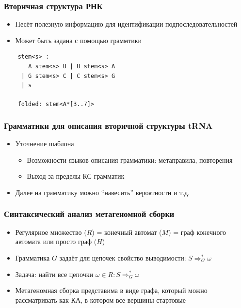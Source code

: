 \documentclass{beamer}
\begin{document}
\begin{frame}[fragile]
\transwipe[direction=90]
\frametitle{Вторичная структура РНК}
\begin{itemize}
    \item Несёт полезную информацию для идентификации подпоследовательностей
    \item Может быть задана с помощью граммтики
\end{itemize}
\begin{verbatim}
    stem<s> : 
       A stem<s> U | U stem<s> A 
     | G stem<s> C | C stem<s> G 
     | s

    folded: stem<A*[3..7]> 
\end{verbatim} 
\end{frame}

\begin{frame}[fragile]
  \transwipe[direction=90]
  \frametitle{Грамматики для описания вторичной структуры tRNA}
  \begin{itemize}
    \item Уточнение шаблона
    \begin{itemize}
       \item Возможности языков описания грамматики: метаправила, повторения
       \item Выход за пределы КС-грамматик
    \end{itemize}
    \item Далее на грамматику можно ``навесить'' вероятности и т.д.
  \end{itemize}
\end{frame}

\begin{frame}[fragile]
  \transwipe[direction=90]
  \frametitle{Синтаксический анализ метагеномной сборки}
  \begin{itemize}
    \item Регулярное множество ($R$) = конечный автомат ($M$) = граф конечного автомата или просто 
    граф ($H$)
    \pause
    \item Грамматика $G$ задаёт для цепочек свойство выводимости: $S \Rightarrow^*_G \omega$
    \item Задача: найти все цепочки $\omega \in R : S \Rightarrow^*_G \omega$ 
    \item Метагеномная сборка представима в виде графа, который можно рассматривать как КА, в 
    котором все вершины стартовые
  \end{itemize}
\end{frame}
\end{document}
